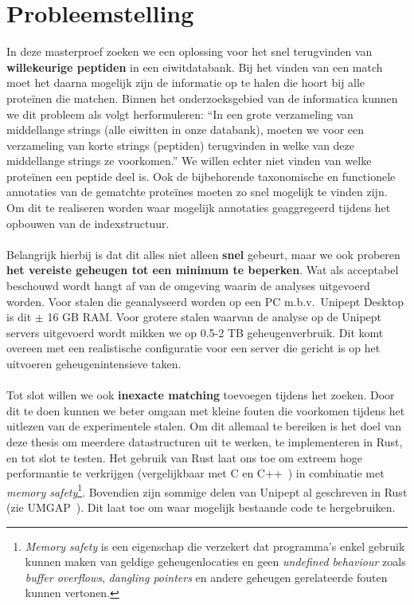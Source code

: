 \section{Probleemstelling}\label{sec:probleemstelling}
In deze masterproef zoeken we een oplossing voor het snel terugvinden van \textbf{willekeurige peptiden} in een eiwitdatabank.
Bij het vinden van een match moet het daarna mogelijk zijn de informatie op te halen die hoort bij alle proteïnen die matchen.
Binnen het onderzoeksgebied van de informatica kunnen we dit probleem als volgt herformuleren:
``In een grote verzameling van middellange strings (alle eiwitten in onze databank), moeten we voor een verzameling van korte strings (peptiden) terugvinden in welke van deze middellange strings ze voorkomen.''
We willen echter niet vinden van welke proteïnen een peptide deel is.
Ook de bijbehorende taxonomische en functionele annotaties van de gematchte proteïnes moeten zo snel mogelijk te vinden zijn.
Om dit te realiseren worden waar mogelijk annotaties geaggregeerd tijdens het opbouwen van de indexstructuur.
\\ \\
Belangrijk hierbij is dat dit alles niet alleen \textbf{snel} gebeurt, maar we ook proberen \textbf{het vereiste geheugen tot een minimum te beperken}.
Wat als acceptabel beschouwd wordt hangt af van de omgeving waarin de analyses uitgevoerd worden.
Voor stalen die geanalyseerd worden op een PC m.b.v.~Unipept Desktop is dit $\pm$ 16 GB RAM\@.
Voor grotere stalen waarvan de analyse op de Unipept servers uitgevoerd wordt mikken we op 0.5-2 TB geheugenverbruik.
Dit komt overeen met een realistische configuratie voor een server die gericht is op het uitvoeren geheugenintensieve taken.
\\ \\
Tot slot willen we ook \textbf{inexacte matching} toevoegen tijdens het zoeken.
Door dit te doen kunnen we beter omgaan met kleine fouten die voorkomen tijdens het uitlezen van de experimentele stalen.
Om dit allemaal te bereiken is het doel van deze thesis om meerdere datastructuren uit te werken, te implementeren in Rust, en tot slot te testen.
Het gebruik van Rust laat ons toe om extreem hoge performantie te verkrijgen (vergelijkbaar met C en C++~\cite{rustPerformantie}) in combinatie met \textit{memory safety}\footnote{\textit{Memory safety} is een eigenschap die verzekert dat programma's enkel gebruik kunnen maken van geldige geheugenlocaties en geen \textit{undefined behaviour} zoals \textit{buffer overflows}, \textit{dangling pointers} en andere geheugen gerelateerde fouten kunnen vertonen.}.
Bovendien zijn sommige delen van Unipept al geschreven in Rust (zie UMGAP~\cite{UMGAP_paper, UMGAP_source}).
Dit laat toe om waar mogelijk bestaande code te hergebruiken.


